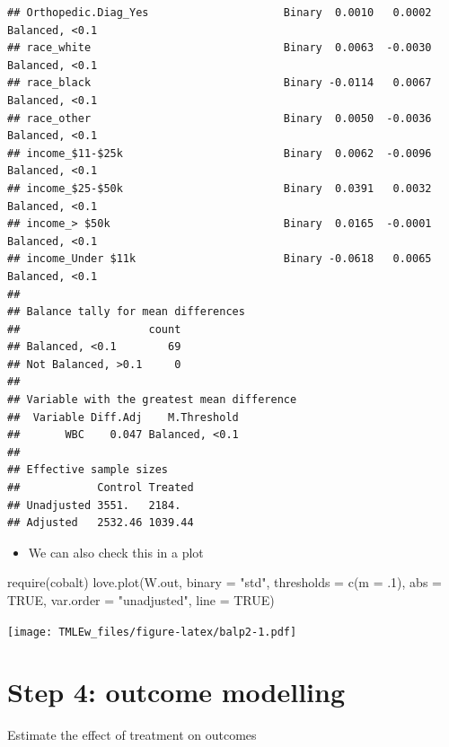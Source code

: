 \documentclass[
]{book}
\newenvironment{Shaded}{\begin{snugshade}}{\end{snugshade}}
\newcommand{\AttributeTok}[1]{\textcolor[rgb]{0.77,0.63,0.00}{#1}}
\newcommand{\ConstantTok}[1]{\textcolor[rgb]{0.00,0.00,0.00}{#1}}
\newcommand{\DecValTok}[1]{\textcolor[rgb]{0.00,0.00,0.81}{#1}}
\newcommand{\FunctionTok}[1]{\textcolor[rgb]{0.00,0.00,0.00}{#1}}
\newcommand{\NormalTok}[1]{#1}
\newcommand{\StringTok}[1]{\textcolor[rgb]{0.31,0.60,0.02}{#1}}
\providecommand{\tightlist}{%
  \setlength{\itemsep}{0pt}\setlength{\parskip}{0pt}}
\begin{document}
\begin{verbatim}
## Orthopedic.Diag_Yes                     Binary  0.0010   0.0002 Balanced, <0.1
## race_white                              Binary  0.0063  -0.0030 Balanced, <0.1
## race_black                              Binary -0.0114   0.0067 Balanced, <0.1
## race_other                              Binary  0.0050  -0.0036 Balanced, <0.1
## income_$11-$25k                         Binary  0.0062  -0.0096 Balanced, <0.1
## income_$25-$50k                         Binary  0.0391   0.0032 Balanced, <0.1
## income_> $50k                           Binary  0.0165  -0.0001 Balanced, <0.1
## income_Under $11k                       Binary -0.0618   0.0065 Balanced, <0.1
## 
## Balance tally for mean differences
##                    count
## Balanced, <0.1        69
## Not Balanced, >0.1     0
## 
## Variable with the greatest mean difference
##  Variable Diff.Adj    M.Threshold
##       WBC    0.047 Balanced, <0.1
## 
## Effective sample sizes
##            Control Treated
## Unadjusted 3551.   2184.  
## Adjusted   2532.46 1039.44
\end{verbatim}

\begin{itemize}
\tightlist
\item
  We can also check this in a plot
\end{itemize}

\begin{Shaded}
\begin{Highlighting}[]
\FunctionTok{require}\NormalTok{(cobalt)}
\FunctionTok{love.plot}\NormalTok{(W.out, }\AttributeTok{binary =} \StringTok{"std"}\NormalTok{,}
          \AttributeTok{thresholds =} \FunctionTok{c}\NormalTok{(}\AttributeTok{m =}\NormalTok{ .}\DecValTok{1}\NormalTok{),}
          \AttributeTok{abs =} \ConstantTok{TRUE}\NormalTok{, }
          \AttributeTok{var.order =} \StringTok{"unadjusted"}\NormalTok{, }
          \AttributeTok{line =} \ConstantTok{TRUE}\NormalTok{)}
\end{Highlighting}
\end{Shaded}

\texttt{[image: TMLEw\_files/figure-latex/balp2-1.pdf]}

\hypertarget{step-4-outcome-modelling}{%
\section{Step 4: outcome modelling}\label{step-4-outcome-modelling}}

Estimate the effect of treatment on outcomes
\end{document}
